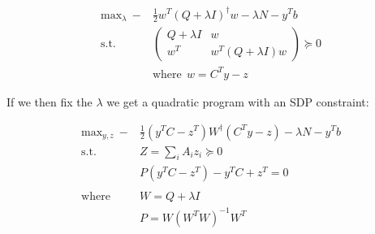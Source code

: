 \documentclass{article}
\begin{document}
\begin{align}
	\text{max}_{\lambda} ~ -&\frac{1}{2} w^T (Q+\lambda I)^\dagger w - \lambda N - y^T b \\ 
	\text{s.t.} ~~ &\begin{pmatrix} Q+\lambda I & w \\ w^T & w^T(Q+\lambda I)w \end{pmatrix} \succeq 0 \\
				   &\text{where} ~~ w = C^T y - z
\end{align}

If we then fix the $\lambda$ we get a quadratic program with an SDP constraint:

\begin{align}
	\text{max}_{y, z} ~ -&\frac{1}{2} (y^T C - z^T) W^\dagger (C^Ty - z) - \lambda N - y^T b \\ 
	\text{s.t.} ~~ &Z  = \sum_i A_i z_i \succeq 0 \\
				   &P(y^TC-z^T)-y^T C+z^T = 0 \\ 
				   \\
				\text{where} ~~ &W = Q+\lambda I \\
				&P = W (W^T W)^{-1} W^T
\end{align}
\end{document}
